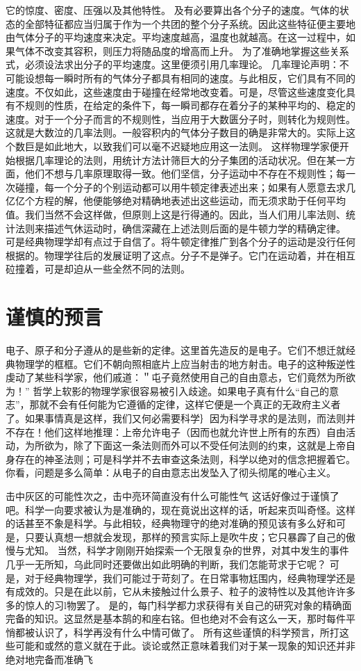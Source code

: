 它的惊度、密度、压强以及其他特性。
及有必要算出各个分子的速度。气体的状态的全部特征都应当归属于作为一个共团的整个分子系统。因此这些特征便主要地由气体分子的平均速度来决定。平均速度越高，温度也就越高。在这一过程中，如果气体不改变其容积，则压力将随品度的增高而上升。
为了准确地掌握这些关系式，必须设法求出分子的平均速度。这里便须引用几率理论。
几率理论声明：不可能设想每一瞬时所有的气体分子都具有相同的速度。与此相反，它们具有不同的速度。不仅如此，这些速度由于碰撞在经常地改变着。可是，尽管这些速度变化具有不规则的性质，在给定的条件下，每一瞬司都存在着分子的某种平均的、稳定的速度。对于一个分子而言的不规则性，当应用于大数匮分子时，则转化为规则性。这就是大数泣的几率法则。一般容积内的气体分子数目的确是非常大的。实际上这个数巨是如此地大，以致我们可以毫不迟疑地应用这一法则。
这样物理学家便开始根据几率理论的法则，用统计方法计筛巨大的分子集团的活动状况。但在某一方面，他们不想与几率原理取得一致。他们坚信，分子运动中不存在不规则性；每一次碰撞，每一个分子的个别运动都可以用牛顿定律表述出来；如果有人愿意去求几亿亿个方程的解，他便能够绝对精确地表述出这些运动，而无须求助于任何平均值。我们当然不会这样做，但原则上这是行得通的。因此，当人们用儿率法则、统计法则来描述气休运动时，确信深藏在上述法则后面的是牛顿力学的精确定律。
可是经典物理学却有点过于自信了。将牛顿定律推广到各个分子的运动是没行任何根据的。物理学往后的发展证明了这点。分子不是弹子。它门在运动着，并在相互砬撞着，可是却迫从一些全然不同的法则。

\section{谨慎的预言}

电子、原子和分子遵从的是些新的定律。这里首先造反的是电子。它们不想迁就经典物理学的框框。它们不朝向照相底片上应当射击的地方射击。电子的这种叛逆性虔动了某些科学家，他们戚道：＂屯子竟然使用自己的自由意忐，它们竟然为所欲为！”
哲学上软影的物理学家很容易被引入歧途。如果电子真有什么“自己的意志”，那就不会有任何能为它遵循的定律，这样它便是一个真正的无政府主义者了。如果事情真是这样，我们又何必需要科学｝因为科学寻求的是法则，而法则并不存在！他们这样地推理：上帝允许电子（因而也就允许世上所有的东西）自由活动，为所欲为，除了下面这一条法则而外可以不受任何法则的约束，这就是上帝自身存在的神圣法则；可是科学并不去审查这条法则，科学以绝对的信念把握着它。你看，问题是多么简单：从电子的自由意志出发坠入了彻头彻尾的唯心主义。

击中灰区的可能性次之，击中亮环简直没有什么可能性气
这话好像过于谨慎了吧。科学一向要求被认为是准确的，现在竟说出这样的话，听起来页叫奇怪。这样的话甚至不象是科学。与此相较，经典物理守的绝对准确的预见该有多么好和可是，只要认真想一想就会发现，那样的预言实际上是吹牛皮；它只暴霹了自己的傲慢与尤知。
当然，科学才刚刚开始探索一个无限复杂的世界，对其中发生的事件几乎一无所知，乌此同时还要做出如此明确的判断，我们怎能苛求于它呢？
可是，对于经典物理学，我们可能过于苛刻了。在日常事物尪围内，经典物理学还是有成效的。只是在此以前，它从未接触过什么景子、粒子的波特性以及其他许许多多的惊人的习l物罢了。
是的，每门科学都力求获得有关自己的研究对象的精确面完备的知识。这显然是基本鹄的和座右铭。但也绝对不会有这么一天，那时每件平悄都被认识了，科学再没有什么中情可做了。
所有这些谨慎的科学预言，所打这些可能和或然的意义就在于此。谈论或然正意味着我们对于某一现象的知识还并非绝对地完备而准确飞

